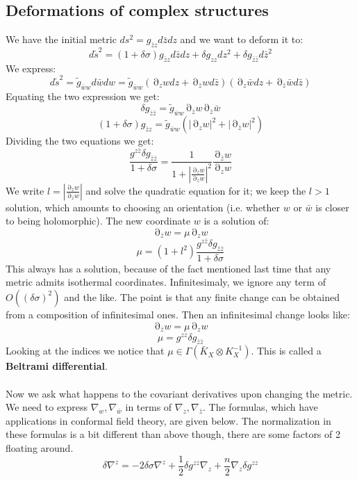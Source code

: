 \documentclass[12 pt]{article}
\DeclareMathOperator {\p} {\partial}
\theoremstyle{plain}
\theoremstyle{definition}
\theoremstyle{remark}
\begin{document}
\subsection*{Deformations of complex structures}
We have the initial metric $ds^2 = g_{\bar z z} d\bar z dz$ and we want to deform it to:
\[       d\tilde s^2 = (1 + \delta \sigma) g_{\bar z z} d \bar z dz + \delta g_{zz} dz^2 + \delta g_{\bar z \bar z} d \bar z^2     \]
We express:
\[      d\tilde s^2 = \tilde g_{\bar w w} d \bar w dw = \tilde g_{\bar w w} ( \p_z w dz + \p_{\bar z} w d \bar z)( \p_z \bar w dz + \p_{\bar z} \bar w d \bar z)       \]
Equating the two expression we get:
\[          \delta g_{\bar z \bar z} = \tilde g_{\bar w w} \p_{\bar z} w \p_{\bar z} \bar w        \]
\[         (1 + \delta \sigma) g_{\bar z z} = \tilde g_{\bar w w} (|\p_z w|^2 + |\p_{\bar z} w|^2)       \]
Dividing the two equations we get:
\[        \frac{g^{z \bar z} \delta g_{\bar z \bar z}}{1 + \delta \sigma}   = \frac{1}{1 + \left| \frac{\p_{\bar z} w}{\p_z w}  \right|^2}   \frac{\p_{\bar z} w}{\p_z w}      \]
We write $l = \left| \frac{\p_{\bar z} w}{\p_z w}  \right|$ and solve the quadratic equation for it; we keep the $l>1$ solution, which amounts to choosing an orientation (i.e. whether $w$ or $\bar w$ is closer to being holomorphic). The new coordinate $w$ is a solution of:
\[           \p_{\bar z} w = \mu \p_{z} w        \]
\[       \mu = (1+l^2) \frac{g^{z\bar z} \delta g_{\bar z \bar z}}{1 + \delta \sigma}       \]
This always has a solution, because of the fact mentioned last time that any metric admits isothermal coordinates. Infinitesimaly, we ignore any term of $O((\delta \sigma)^2)$ and the like. The point is that any finite change can be obtained from a composition of infinitesimal ones. Then an infinitesimal change looks like:
\[           \p_{\bar z} w = \mu \p_{z} w        \]
\[       \mu = g^{z\bar z} \delta g_{\bar z \bar z}      \]
Looking at the indices we notice that $\mu \in \Gamma(\bar K_X \otimes K_X^{-1})$. This is called a \textbf{Beltrami differential}.
\\
\\
Now we ask what happens to the covariant derivatives upon changing the metric. We need to express $\nabla_w, \nabla_{\bar w}$ in terms of $\nabla_z, \nabla_{\bar z}$. The formulas, which have applications in conformal field theory, are given below. The normalization in these formulas is a bit different than above though, there are some factors of 2 floating around.
\[       \delta \nabla^z = -2 \delta \sigma \nabla^z + \frac{1}{2} \delta g^{zz} \nabla_z + \frac{n}{2} \nabla_z \delta g^{zz}       \]
\end{document}

